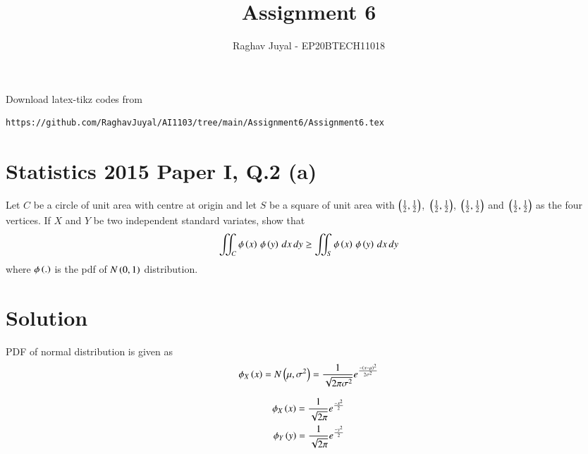 \documentclass[journal,12pt,twocolumn]{IEEEtran}
\begin{document}
\let\vec\mathbf
\renewcommand{\thefigure}{\theproblem}
\def\putbox#1#2#3{\makebox[0in][l]{\makebox[#1][l]{}\raisebox{\baselineskip}[0in][0in]{\raisebox{#2}[0in][0in]{#3}}}}
     \def\rightbox#1{\makebox[0in][r]{#1}}
     \def\centbox#1{\makebox[0in]{#1}}
     \def\topbox#1{\raisebox{-\baselineskip}[0in][0in]{#1}}
     \def\midbox#1{\raisebox{-0.5\baselineskip}[0in][0in]{#1}}
\vspace{3cm}
\title{Assignment 6}
\author{Raghav Juyal - EP20BTECH11018}
\maketitle
\newpage
\bigskip
\renewcommand{\thefigure}{\theenumi}
\renewcommand{\thetable}{\theenumi}
Download latex-tikz codes from 
%
\begin{lstlisting}
https://github.com/RaghavJuyal/AI1103/tree/main/Assignment6/Assignment6.tex
\end{lstlisting}
\section*{Statistics 2015 Paper I, Q.2 (a)}
Let $C$ be a circle of unit area with centre at origin and let $S$ be a square of unit area with $\left(\frac{1}{2},\frac{1}{2}\right)$, $\,\left(\frac{1}{2},\frac{1}{2}\right)$, $\,\left(\frac{1}{2},\frac{1}{2}\right)$ and $\,\left(\frac{1}{2},\frac{1}{2}\right)$ as the four vertices. If $X$ and $Y$ be two independent standard variates, show that
\begin{align*}
    \iint_C{\phi\left(x\right)\,\phi\left(y\right)\,dx\,dy} \geq \iint_S{\phi\left(x\right)\,\phi\left(y\right)\,dx\,dy}
\end{align*}
where $\phi\left(.\right)$ is the pdf of $N\left(0,1\right)$ distribution.
\section*{Solution}
\begin{definition}
PDF of normal distribution is given as
\begin{align}
    \phi_X\left(x\right) = N\left(\mu,\sigma^2\right) = \frac{1}{\sqrt{2\pi\sigma^2}}e^\frac{-\left(x-\mu\right)^2}{2\sigma^2}
\end{align}
\end{definition}

\begin{corollary}
\begin{align}
    \phi_X\left(x\right) = \frac{1}{\sqrt{2\pi}}e^\frac{-x^2}{2}\label{eq1}\\
    \phi_Y\left(y\right) = \frac{1}{\sqrt{2\pi}}e^\frac{-y^2}{2}\label{eq2}
\end{align}
\end{corollary}
\end{document}

